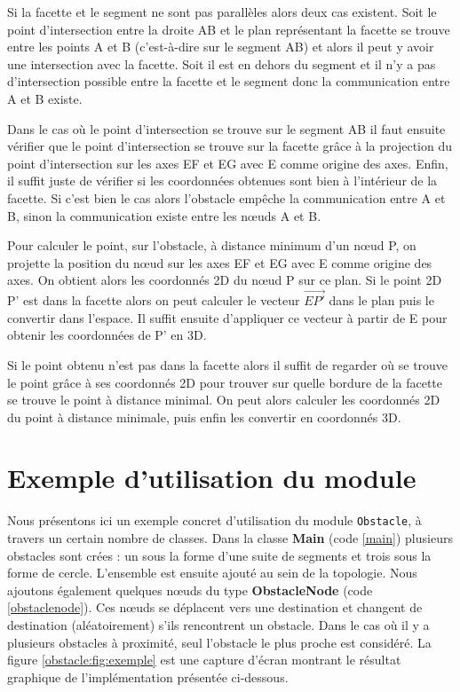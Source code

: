 \documentclass{article}
\newcommand{\obstacle}{{\tt Obstacle}\xspace}
\begin{document}
Si la facette et le segment ne sont pas parallèles alors deux cas existent. Soit le point d'intersection entre la droite AB et le plan représentant la facette se trouve entre les points A et B (c'est-à-dire sur le segment AB) et alors il peut y avoir une intersection avec la facette. Soit il est en dehors du segment et il n'y a pas d'intersection possible entre la facette et le segment donc la communication entre A et B existe.\medskip

Dans le cas où le point d'intersection se trouve sur le segment AB il faut ensuite vérifier que le point d'intersection se trouve sur la facette grâce à la projection du point d'intersection sur les axes EF et EG avec E comme origine des axes. Enfin, il suffit juste de vérifier si les coordonnées obtenues sont bien à l'intérieur de la facette. Si c'est bien le cas alors l'obstacle empêche la communication entre A et B, sinon la communication existe entre les n\oe uds A et B.\medskip

Pour calculer le point, sur l'obstacle, à distance minimum d'un n\oe ud P, on projette la position du n\oe ud sur les axes EF et EG avec E comme origine des axes. On obtient alors les coordonnés 2D du n\oe ud P sur ce plan. Si le point 2D P' est dans la facette alors on peut calculer le vecteur $\overrightarrow{EP'}$ dans le plan puis le convertir dans l'espace.
Il suffit ensuite d'appliquer ce vecteur à partir de E pour obtenir les coordonnées de P' en 3D.\medskip

Si le point obtenu n'est pas dans la facette alors il suffit de regarder où se trouve le point grâce à ses coordonnés 2D pour trouver sur quelle bordure de la facette se trouve le point à distance minimal. On peut alors calculer les coordonnés 2D du point à distance minimale, puis enfin les convertir en coordonnés 3D.

\section{Exemple d'utilisation du module}
\label{exemple-obstacle}

Nous présentons ici un exemple concret d'utilisation du module \obstacle, à travers un certain nombre de classes.
Dans la classe \textbf{Main} (code \ref{main}) plusieurs obstacles sont crées : un sous la forme d'une suite de segments et trois sous la forme de cercle. L'ensemble est ensuite ajouté au sein de la topologie. Nous ajoutons également quelques n\oe uds du type \textbf{ObstacleNode} (code \ref{obstaclenode}). Ces n\oe uds se déplacent vers une destination et changent de destination (aléatoirement) s'ils rencontrent un obstacle.
Dans le cas où il y a plusieurs obstacles à proximité, seul l'obstacle le plus proche est considéré.
La figure \ref{obstacle:fig:exemple} est une capture d'écran montrant le résultat graphique de l'implémentation présentée ci-dessous.\medskip
\end{document}
